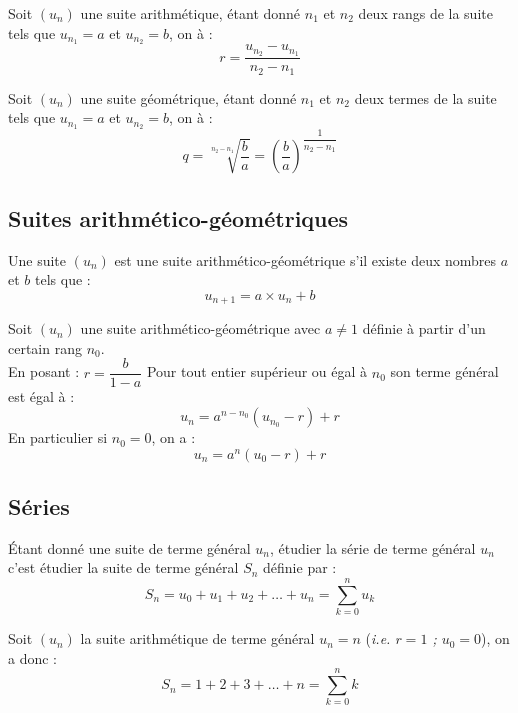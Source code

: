 \documentclass[11pt]{article}
\begin{document}
\begin{propriete}
Soit $(u_n)$ une suite arithmétique, étant donné $n_1$ et $n_2$ deux
rangs de la suite tels que $u_{n_1}=a$ et $u_{n_2}=b$, on  à :
\[ r = \dfrac{u_{n_2}-u_{n_1}}{n_2-n_1}\]
\end{propriete}

\begin{propriete}
Soit $(u_n)$ une suite géométrique, étant donné $n_1$ et $n_2$ deux
termes de la suite tels que $u_{n_1}=a$ et $u_{n_2}=b$, on  à :
\[ q = \sqrt[n_{2}-n_{1}]{\dfrac{b}{a}} = \left( \dfrac{b}{a} \right)^{\dfrac{1}{n_2-n_1}}\]
\end{propriete}


\subsection{Suites  arithmético-géométriques}

\begin{definition}
Une suite $(u_n)$ est une suite arithmético-géométrique s'il existe
deux nombres $a$ et $b$ tels que :
\[ u_{n+1} = a \times u_n + b \]
\end{definition}

\begin{theoreme}
Soit $(u_n)$ une suite arithmético-géométrique avec $a \neq 1$ définie à
partir d'un certain rang $n_0$.\\
En posant : $r = \dfrac{b}{1-a}$
Pour tout entier supérieur ou égal à $n_0$ son terme général est égal
à :
\[ u_n = a^{n-n_0}(u_{n_0}-r)+r\]
En particulier si $n_0=0$, on a : 
\[ u_n = a^n(u_0-r)+r\]
\end{theoreme}


\subsection{Séries}

\begin{definition}
Étant donné une suite de terme général $u_n$, étudier la série de
terme général $u_n $ c'est étudier la suite de terme général $S_n$
définie par :
\[ S_n = u_0 + u_1 + u_2 + \ldots + u_n = \sum_{k=0}^{n} u_k \]
\end{definition}

\begin{exemple}
Soit $(u_n)$ la suite arithmétique de terme général $u_n=n$
(\textit{i.e. $r=1$ ; $u_0=0$}), on a donc : 
\[ S_n = 1 + 2 + 3 + \ldots + n = \sum_{k=0}^{n} k \]
\end{exemple}
\end{document}
